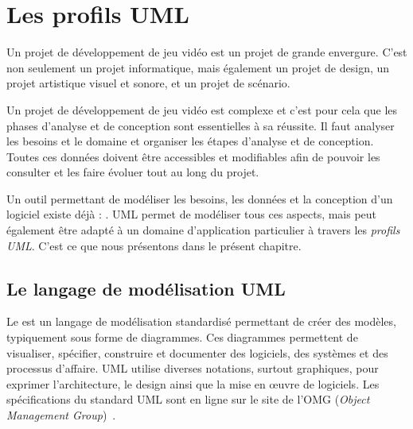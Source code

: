 \chapter{Les profils UML}
\label{chap.profils-UML}

Un projet de développement de jeu vidéo est un projet de grande envergure. C'est non seulement un projet informatique, mais également un projet de design, un projet artistique visuel et sonore, et un projet de scénario.

Un projet de développement de jeu vidéo est complexe et c'est pour cela que les phases d'analyse et de conception sont essentielles à sa réussite. Il faut analyser les besoins et le domaine et organiser les étapes d'analyse et de conception. Toutes ces données doivent être accessibles et modifiables afin de pouvoir les consulter et les faire évoluer tout au long du projet.

Un outil permettant de modéliser les besoins, les données et la conception d'un logiciel existe déjà : . UML permet de mod\'eliser tous ces aspects, mais peut également être adapté à un domaine d'application particulier à travers les \emph{profils UML}. C'est ce que nous présentons dans le présent chapitre.


\section{Le langage de modélisation UML}

Le  est un langage de modélisation standardisé permettant de créer des mod\`eles, typiquement sous forme de diagrammes.
Ces diagrammes permettent de visualiser, spécifier, construire et documenter des logiciels, des systèmes et des processus d'affaire.
UML utilise diverses notations,  surtout graphiques, pour exprimer l'architecture, le design ainsi que la mise en \oe{}uvre de logiciels.
Les spécifications du standard UML sont en ligne sur le site de l'OMG (\emph{Object Management Group})~\cite{OMG_UML}.




